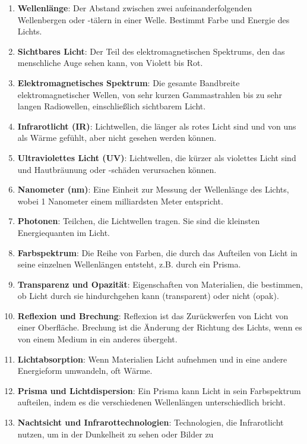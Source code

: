 \documentclass{vorlage-design-main}
\begin{document}
\begin{enumerate}
\def\labelenumi{\arabic{enumi}.}
\item
  \textbf{Wellenlänge}: Der Abstand zwischen zwei aufeinanderfolgenden
  Wellenbergen oder -tälern in einer Welle. Bestimmt Farbe und Energie
  des Lichts.
\item
  \textbf{Sichtbares Licht}: Der Teil des elektromagnetischen Spektrums,
  den das menschliche Auge sehen kann, von Violett bis Rot.
\item
  \textbf{Elektromagnetisches Spektrum}: Die gesamte Bandbreite
  elektromagnetischer Wellen, von sehr kurzen Gammastrahlen bis zu sehr
  langen Radiowellen, einschließlich sichtbarem Licht.
\item
  \textbf{Infrarotlicht (IR)}: Lichtwellen, die länger als rotes Licht
  sind und von uns als Wärme gefühlt, aber nicht gesehen werden können.
\item
  \textbf{Ultraviolettes Licht (UV)}: Lichtwellen, die kürzer als
  violettes Licht sind und Hautbräunung oder -schäden verursachen
  können.
\item
  \textbf{Nanometer (nm)}: Eine Einheit zur Messung der Wellenlänge des
  Lichts, wobei 1 Nanometer einem milliardsten Meter entspricht.
\item
  \textbf{Photonen}: Teilchen, die Lichtwellen tragen. Sie sind die
  kleinsten Energiequanten im Licht.
\item
  \textbf{Farbspektrum}: Die Reihe von Farben, die durch das Aufteilen
  von Licht in seine einzelnen Wellenlängen entsteht, z.B. durch ein
  Prisma.
\item
  \textbf{Transparenz und Opazität}: Eigenschaften von Materialien, die
  bestimmen, ob Licht durch sie hindurchgehen kann (transparent) oder
  nicht (opak).
\item
  \textbf{Reflexion und Brechung}: Reflexion ist das Zurückwerfen von
  Licht von einer Oberfläche. Brechung ist die Änderung der Richtung des
  Lichts, wenn es von einem Medium in ein anderes übergeht.
\item
  \textbf{Lichtabsorption}: Wenn Materialien Licht aufnehmen und in eine
  andere Energieform umwandeln, oft Wärme.
\item
  \textbf{Prisma und Lichtdispersion}: Ein Prisma kann Licht in sein
  Farbspektrum aufteilen, indem es die verschiedenen Wellenlängen
  unterschiedlich bricht.
\item
  \textbf{Nachtsicht und Infrarottechnologien}: Technologien, die
  Infrarotlicht nutzen, um in der Dunkelheit zu sehen oder Bilder zu

\end{enumerate}
\end{document}
